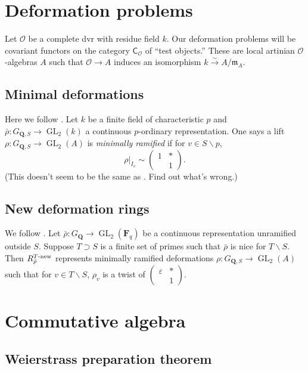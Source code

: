 \documentclass{amsart}
\DeclareMathOperator{\GL}{GL}
\newcommand{\cO}{\mathcal{O}}
\newcommand{\dF}{\mathbf{F}}
\newcommand{\dQ}{\mathbf{Q}}
\newcommand{\fm}{\mathfrak{m}}
\newcommand{\iso}{\xrightarrow\sim}
\begin{document}
\section{Deformation problems}

Let $\cO$ be a complete dvr with residue field $k$. Our deformation problems 
will be covariant functors on the category $\mathsf{C}_\cO$ of ``test 
objects.'' These are local artinian $\cO$-algebras $A$ such that 
$\cO\to A$ induces an isomorphism $k\iso A/\fm_A$. 


\subsection{Minimal deformations}

Here we follow \cite[\S2.1]{khare-2003}. Let $k$ be a finite field of 
characteristic $p$ and $\bar\rho:G_{\dQ,S}\to \GL_2(k)$ a continuous 
$p$-ordinary representation. One says a lift $\rho:G_{\dQ,S}\to \GL_2(A)$ is 
\emph{minimally ramified} if for $v\in S\smallsetminus p$, 
\[
  \rho|_{I_v}\sim \begin{pmatrix} 1 & \ast \\ & 1 \end{pmatrix} .
\]
\textsf{(This doesn't seem to be the same as 
\cite[p.180]{khare-ramakrishna-2003}. Find out what's wrong.)}


\subsection{New deformation rings}

We follow \cite[df.1]{khare-ramakrishna-2003}. 
Let $\bar\rho:G_\dQ\to \GL_2(\dF_q)$ be a continuous representation unramified 
outside $S$. Suppose $T\supset S$ is a finite set of primes such that 
$\bar\rho$ is nice for $T\smallsetminus S$. Then 
$R_{\bar\rho}^{T\textnormal{-new}}$ represents minimally ramified deformations 
$\rho:G_{\dQ,S} \to \GL_2(A)$ such that for $v\in T\smallsetminus S$, 
$\rho_v$ is a twist of $\begin{pmatrix} \varepsilon & \ast \\ & 1 \end{pmatrix}$. 





\section{Commutative algebra}


\subsection{Weierstrass preparation theorem}
\end{document}

